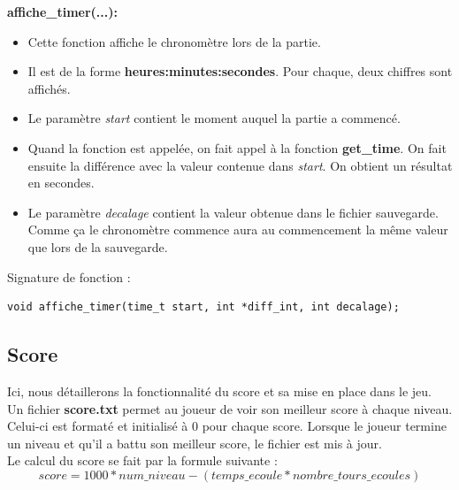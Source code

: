 \documentclass{article}
\begin{document}
\textbf{affiche\_timer(...):}
\begin{itemize}
\item Cette fonction affiche le chronomètre lors de la partie.
\item Il est de la forme \textbf{heures:minutes:secondes}. Pour chaque, deux chiffres sont affichés.
\item Le paramètre \textit{start} contient le moment auquel la partie a commencé.
\item Quand la fonction est appelée, on fait appel à la fonction \textbf{get\_time}. On fait ensuite la différence avec la valeur contenue dans \textit{start}. On obtient un résultat en secondes.
\item Le paramètre \textit{decalage} contient la valeur obtenue dans le fichier sauvegarde. Comme ça le chronomètre commence aura au commencement la même valeur que lors de la sauvegarde.
\end{itemize}
Signature de fonction :
\begin{lstlisting}
void affiche_timer(time_t start, int *diff_int, int decalage);
\end{lstlisting}
\newpage

\subsection{Score}
Ici, nous détaillerons la fonctionnalité du score et sa mise en place dans le jeu.\\ 
Un fichier \textbf{score.txt} permet au joueur de voir son meilleur score à chaque niveau. Celui-ci est formaté et initialisé à 0 pour chaque score. Lorsque le joueur termine un niveau et qu'il a battu son meilleur score, le fichier est mis à jour.\\
Le calcul du score se fait par la formule suivante :
\begin{equation}
    score = 1000*num\_niveau - (temps\_ecoule*nombre\_tours\_ecoules)
\end{equation}




\listoffigures
\end{document}

